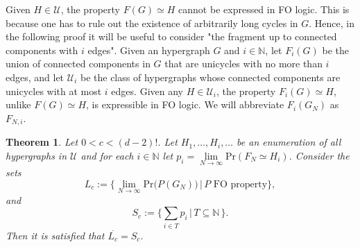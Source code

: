 \documentclass[11pt,notitlepage,a4paper]{article}
\newtheorem{theorem}{Theorem}[section]
\theoremstyle{definition}
\newcommand{\N}{\mathbb{N}}
\newcommand{\LN}{\lim\limits_{N\to \infty}}
\begin{document}
Given $H\in \mathcal{U}$, the property
$F(G)\simeq H$ cannot be expressed in FO logic. This is
because one has to rule out the existence of arbitrarily 
long cycles in $G$. Hence, in the following proof 
it will be useful to consider "the fragment up
to connected components with $i$ edges".
Given an hypergraph $G$ and $i\in \N$, let $F_i(G)$
be the union of connected components
in $G$ that are unicycles with no more than $i$ edges, and let
$\mathcal{U}_i$ be the class of hypergraphs whose connected components
are unicycles with at most $i$ edges. 
Given any $H\in \mathcal{U}_i$, the property $F_i(G)\simeq H$, 
unlike $F(G)\simeq H$, is expressible in FO logic. We will 
abbreviate $F_i(G_N)$ as $F_{N,i}$. 

\begin{theorem}
	Let $0<c<(d-2)!$. Let 
	$H_1,\dots, H_i,\dots$ be an enumeration of all
	hypergraphs in $\mathcal{U}$ and for each $i\in \N$ 
	let $p_i=\LN \mathrm{Pr}(F_N\simeq H_i)$. 
	Consider the sets 
	\[
	L_c:=\{
	\LN \mathrm{Pr}\big(P(G_N)\big) \, | \,
	P \text{ FO property} \},
	\] 
	and 
	\[
	S_c:=\{
	\sum_{i\in T} p_i \, | \, T \subseteq \N \,
	\}.	
	\]
	Then it is satisfied that $\overline{L_c}=S_c$. 		
\end{theorem}
\end{document}
